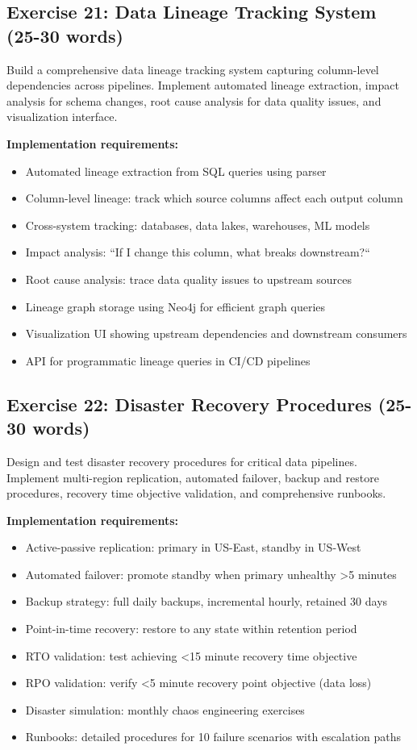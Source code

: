 \subsection{Exercise 21: Data Lineage Tracking System (25-30 words)}

Build a comprehensive data lineage tracking system capturing column-level dependencies across pipelines. Implement automated lineage extraction, impact analysis for schema changes, root cause analysis for data quality issues, and visualization interface.

\textbf{Implementation requirements:}
\begin{itemize}
    \item Automated lineage extraction from SQL queries using parser
    \item Column-level lineage: track which source columns affect each output column
    \item Cross-system tracking: databases, data lakes, warehouses, ML models
    \item Impact analysis: ``If I change this column, what breaks downstream?``
    \item Root cause analysis: trace data quality issues to upstream sources
    \item Lineage graph storage using Neo4j for efficient graph queries
    \item Visualization UI showing upstream dependencies and downstream consumers
    \item API for programmatic lineage queries in CI/CD pipelines
\end{itemize}

\subsection{Exercise 22: Disaster Recovery Procedures (25-30 words)}

Design and test disaster recovery procedures for critical data pipelines. Implement multi-region replication, automated failover, backup and restore procedures, recovery time objective validation, and comprehensive runbooks.

\textbf{Implementation requirements:}
\begin{itemize}
    \item Active-passive replication: primary in US-East, standby in US-West
    \item Automated failover: promote standby when primary unhealthy >5 minutes
    \item Backup strategy: full daily backups, incremental hourly, retained 30 days
    \item Point-in-time recovery: restore to any state within retention period
    \item RTO validation: test achieving <15 minute recovery time objective
    \item RPO validation: verify <5 minute recovery point objective (data loss)
    \item Disaster simulation: monthly chaos engineering exercises
    \item Runbooks: detailed procedures for 10 failure scenarios with escalation paths
\end{itemize}

